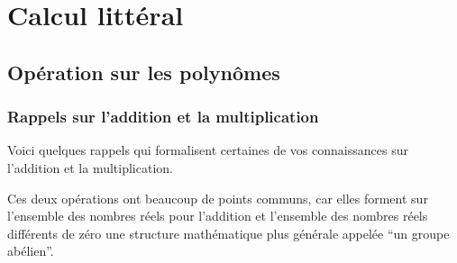 \documentclass[a4paper,12pt]{report}
\begin{document}
\chapter{Calcul littéral}
\thispagestyle{fancy}
\section{Opération sur les polynômes}
\subsection{Rappels sur l'addition et la multiplication}
Voici quelques rappels qui formalisent certaines de vos connaissances sur l'addition et la multiplication. 

Ces deux opérations ont beaucoup de points communs, car elles forment sur l'ensemble des nombres réels pour l'addition et l'ensemble des nombres réels différents de zéro une structure mathématique plus générale appelée \enquote{un groupe abélien}.
\end{document}
